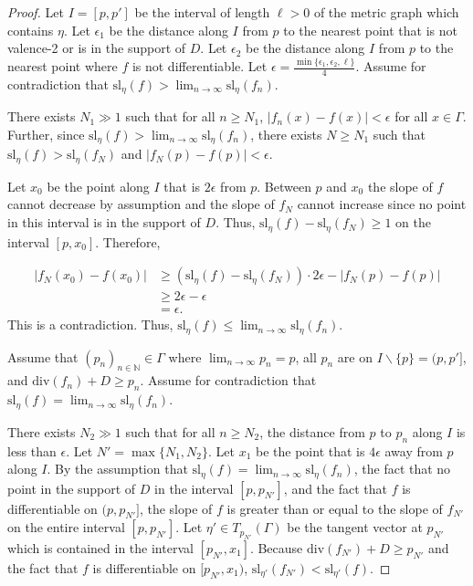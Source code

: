 \documentclass{amsart}
\begin{document}
	\begin{proof}
		Let $I = [p,p']$ be the interval of length $\ell > 0$ of the metric graph which contains $\eta$. Let $\epsilon_1$ be the distance along $I$ from $p$ to the nearest point that is not valence-2 or is in the support of $D$. Let $\epsilon_2$ be the distance along $I$ from $p$ to the nearest point where $f$ is not differentiable. Let $\epsilon = \frac{\min \{ \epsilon_1, \epsilon_2, \ell \}}{4}$. Assume for contradiction that $\displaystyle \mathrm{sl}_{\eta}(f) > \lim_{n \to \infty} \mathrm{sl}_{\eta}(f_n)$. 
		
		There exists $N_1 \gg 1$ such that for all $n \geq N_1$, $|f_n(x) - f(x)| < \epsilon$ for all $x \in \Gamma$. Further, since $\displaystyle \mathrm{sl}_{\eta}(f) > \lim_{n \to \infty} \mathrm{sl}_{\eta}(f_n)$, there exists $N \geq N_1$ such that $\mathrm{sl}_{\eta}(f) > \mathrm{sl}_{\eta}(f_{N})$ and $|f_{N}(p) - f(p)| < \epsilon$.
		
		Let $x_0$ be the point along $I$ that is $2\epsilon$ from $p$. Between $p$ and $x_0$ the slope of $f$ cannot decrease by assumption and the slope of $f_N$ cannot increase since no point in this interval is in the support of $D$. Thus, $\mathrm{sl}_{\eta}(f) - \mathrm{sl}_{\eta}(f_{N}) \geq 1$ on the interval $[p,x_0]$. Therefore, 
		
		\begin{align*}
			|f_{N}(x_0) - f(x_0)| & \geq (\mathrm{sl}_{\eta}(f) - \mathrm{sl}_{\eta}(f_{N})) \cdot 2\epsilon - |f_{N}(p) - f(p)| \\
			& \geq 2\epsilon - \epsilon \\
			& = \epsilon.
		\end{align*}
		This is a contradiction. Thus, $\displaystyle \mathrm{sl}_{\eta}(f) \leq \lim_{n \to \infty} \mathrm{sl}_{\eta}(f_n)$.
		
		Assume that $(p_n)_{n \in \mathbb{N}} \in \Gamma$ where $\displaystyle \lim_{n \to \infty} p_n = p$, all $p_n$ are on $I \backslash \{ p \} = (p,p']$, and $\mathrm{div}(f_n) + D \geq p_n$. Assume for contradiction that $\displaystyle \mathrm{sl}_{\eta}(f) = \lim_{n \to \infty} \mathrm{sl}_{\eta}(f_n)$.
		
		There exists $N_2 \gg 1$ such that for all $n \geq N_2$, the distance from $p$ to $p_n$ along $I$ is less than $\epsilon$. Let $N' = \max \{ N_1, N_2 \}$. Let $x_1$ be the point that is $4\epsilon$ away from $p$ along $I$. By the assumption that $\displaystyle \mathrm{sl}_{\eta}(f) = \lim_{n \to \infty} \mathrm{sl}_{\eta}(f_n)$, the fact that no point in the support of $D$ in the interval $[p,p_{N'}]$, and the fact that $f$ is differentiable on $(p,p_{N'}]$, the slope of $f$ is greater than or equal to the slope of $f_{N'}$ on the entire interval $[p,p_{N'}]$. Let $\eta' \in T_{p_{N'}}(\Gamma)$ be the tangent vector at $p_{N'}$ which is contained in the interval $[p_{N'},x_1]$. Because $\mathrm{div}(f_{N'}) + D \geq p_{N'}$ and the fact that $f$ is differentiable on $[p_{N'},x_1)$, $\mathrm{sl}_{\eta'}(f_{N'}) < \mathrm{sl}_{\eta'}(f)$.
		

\end{proof}
\end{document}
